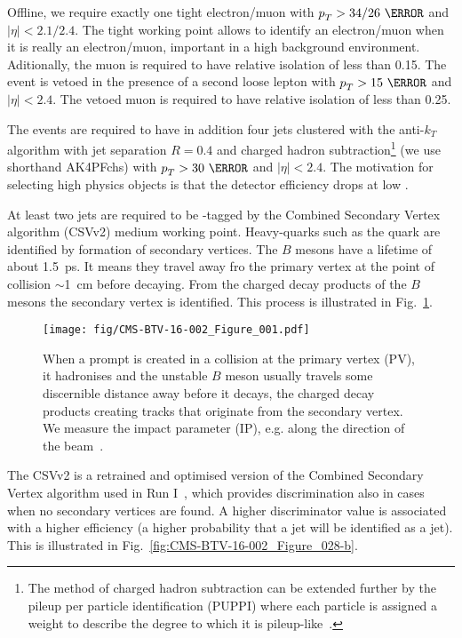 Offline, we require exactly one tight electron/muon with $\pt>34/26~\GeV$ and $|\eta|<2.1/2.4$. The tight working point allows to identify an electron/muon when it is really an electron/muon, important in a high background environment. Aditionally, the muon is required to have relative isolation of less than 0.15. The event is vetoed in the presence of a second loose lepton with $\pt>15~\GeV$ and $|\eta| < 2.4$. The vetoed muon is required to have relative isolation of less than 0.25.

The events are required to have in addition four jets clustered with the anti-$k_{T}$ algorithm with jet separation $R=0.4$ and charged hadron subtraction\footnote{The method of charged hadron subtraction can be extended further by the pileup per particle identification (PUPPI) where each particle is assigned a weight to describe the degree to which it is pileup-like~\cite{Bertolini:2014bba}.} (we use shorthand AK4PFchs) with $\pt>30~\GeV$  and $|\eta|<2.4$. The motivation for selecting high \pt physics objects is that the detector efficiency drops at low \pt.

At least two jets are required to be \cPqb-tagged by the Combined Secondary Vertex algorithm (CSVv2) medium working point. Heavy-quarks such as the \cPqb quark are identified by formation of secondary vertices. The $B$ mesons have a lifetime of about 1.5~ps. It means they travel away fro the primary vertex at the point of collision $\sim$1~cm before decaying. From the charged decay products of the $B$ mesons the secondary vertex is identified. This process is illustrated in Fig.~\ref{fig:CMS-BTV-16-002_Figure_001}.

\begin{figure}[hbtp]
\centering
\texttt{[image: fig/CMS-BTV-16-002\_Figure\_001.pdf]}
\caption{When a prompt \cPqb is created in a collision at the primary vertex (PV), it hadronises and the unstable $B$ meson usually travels some discernible distance away before it decays, the charged decay products creating tracks that originate from the secondary vertex. We measure the impact parameter (IP), e.g. along the direction of the beam~\cite{Sirunyan:2017ezt}.}
\label{fig:CMS-BTV-16-002_Figure_001}
\end{figure}

The CSVv2 is a retrained and optimised version of the Combined Secondary Vertex algorithm used in Run I~\cite{Chatrchyan:2012jua}, which provides discrimination also in cases when no secondary vertices are found. A higher discriminator value is associated with a higher efficiency (a higher probability that a \cPqb jet will be identified as a \cPqb jet). This is illustrated in Fig.~\ref{fig:CMS-BTV-16-002_Figure_028-b}.

